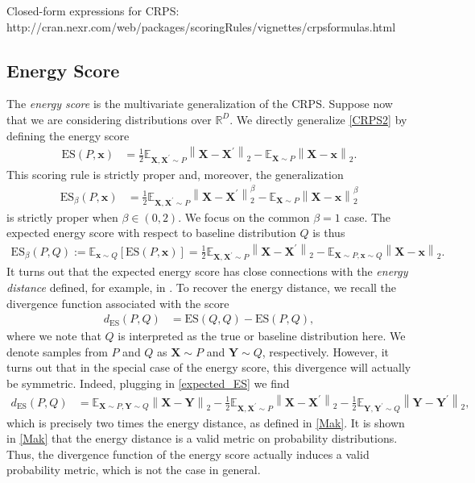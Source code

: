 \documentclass[12pt]{article}
\newcommand*{\norm}[1]{\left\lVert#1\right\rVert}
\newcommand{\E}{\mathbb{E}}
\newcommand{\R}{\mathbb{R}}
\newcommand{\rVec}{\mathbf{X}}
\newcommand{\rVecTwo}{\mathbf{Y}}
\newcommand{\bx}{\mathbf{x}}
\begin{document}
Closed-form expressions for CRPS: http://cran.nexr.com/web/packages/scoringRules/vignettes/crpsformulas.html

\subsection{Energy Score}
The \textit{energy score} is the multivariate generalization of the CRPS. Suppose now that we are considering distributions over $\R^D$. We directly generalize \ref{CRPS2} by defining the energy score
\begin{align}
\text{ES}(P, \bx) &= \frac{1}{2} \E_{\rVec, \rVec^\prime \sim P} \norm{\rVec - \rVec^\prime}_2 - \E_{\rVec \sim P}  \norm{\rVec - \bx}_2. 
\end{align}
This scoring rule is strictly proper and, moreover, the generalization 
\begin{align}
\text{ES}_{\beta}(P, \bx) &= \frac{1}{2} \E_{\rVec, \rVec^\prime \sim P} \norm{\rVec - \rVec^\prime}^\beta_2 - \E_{\rVec \sim P}  \norm{\rVec - \bx}^\beta_2
\end{align}
is strictly proper when $\beta \in (0, 2)$. We focus on the common $\beta = 1$ case. The expected energy score with respect to baseline distribution $Q$ is thus 
\begin{align}
\text{ES}_{\beta}(P, Q) := \E_{\bx \sim Q} \left[\text{ES}(P, \bx)\right] = \frac{1}{2} \E_{\rVec, \rVec^\prime \sim P} \norm{\rVec - \rVec^\prime}_2 - \E_{\rVec \sim P, \bx \sim Q}  \norm{\rVec - \bx}_2. \label{expected_ES}
\end{align}
It turns out that the expected energy score has close connections with the \textit{energy distance} defined, for example, in \cite{Mak}. To recover the energy distance, we recall the 
divergence function associated with the score 
\begin{align}
d_{\text{ES}}(P, Q) &= \text{ES}(Q, Q) - \text{ES}(P, Q),
\end{align}
where we note that $Q$ is interpreted as the true or baseline distribution here. We denote samples from $P$ and $Q$ as $\rVec \sim P$ and $\rVecTwo \sim Q$, respectively. 
However, it turns out that in the special case of the energy score, this divergence will actually be symmetric. 
Indeed, plugging in \ref{expected_ES} we find 
\begin{align}
d_{\text{ES}}(P, Q) &=  \E_{\rVec \sim P, \rVecTwo \sim Q}  \norm{\rVec - \rVecTwo}_2 - \frac{1}{2} \E_{\rVec, \rVec^\prime \sim P} \norm{\rVec - \rVec^\prime}_2 - \frac{1}{2} \E_{\rVecTwo, \rVecTwo^\prime \sim Q} \norm{\rVecTwo - \rVecTwo^\prime}_2,
\end{align}
which is precisely two times the energy distance, as defined in \ref{Mak}. It is shown in \ref{Mak} that the energy distance is a valid metric on probability distributions. Thus, the divergence function of the energy score actually induces a valid probability 
metric, which is not the case in general. 
\end{document}

